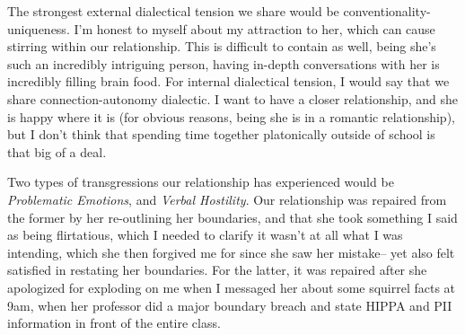\documentclass[12pt]{article}
\begin{document}
\par
The strongest external dialectical tension we share would be conventionality-uniqueness. I'm honest to myself about my attraction to her, which can cause stirring within our relationship. This is difficult to contain as well, being she's such an incredibly intriguing person, having in-depth conversations with her is incredibly filling brain food. For internal dialectical tension, I would say that we share connection-autonomy dialectic. I want to have a closer relationship, and she is happy where it is (for obvious reasons, being she is in a romantic relationship), but I don't think that spending time together platonically outside of school is that big of a deal.
%
\par
Two types of transgressions our relationship has experienced would be \emph{Problematic Emotions}, and \emph{Verbal Hostility}. Our relationship was repaired from the former by her re-outlining her boundaries, and that she took something I said as being flirtatious, which I needed to clarify it wasn't at all what I was intending, which she then forgived me for since she saw her mistake-- yet also felt satisfied in restating her boundaries. For the latter, it was repaired after she apologized for exploding on me when I messaged her about some squirrel facts at 9am, when her professor did a major boundary breach and state HIPPA and PII information in front of the entire class.
\end{document}
